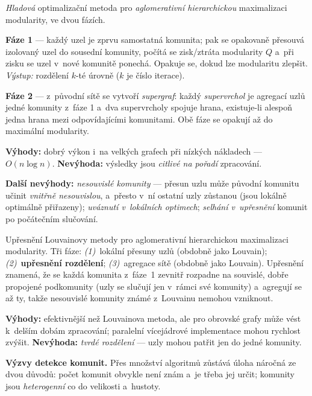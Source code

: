 \documentclass[11pt,a4paper]{article}
\theoremstyle{definition}
\begin{document}
\begin{defbox}
\emph{Hladová} optimalizační metoda pro \emph{aglomerativní hierarchickou} maximalizaci
modularity, ve dvou fázích.

\textbf{Fáze 1} --- každý uzel je zprvu samostatná komunita; pak se opakovaně přesouvá izolovaný
uzel do sousední komunity, počítá se zisk/ztráta modularity $Q$ a~při zisku se uzel v~nové
komunitě ponechá. Opakuje se, dokud lze modularitu zlepšit. \emph{Výstup:} rozdělení $k$-té
úrovně ($k$ je číslo iterace).

\textbf{Fáze 2} --- z~původní sítě se vytvoří \emph{supergraf}: každý \emph{supervrchol} je
agregací uzlů jedné komunity z~fáze 1 a~dva supervrcholy spojuje hrana, existuje-li alespoň jedna
hrana mezi odpovídajícími komunitami. Obě fáze se opakují až do maximální modularity.

\textbf{Výhody:} dobrý výkon i~na velkých grafech při nízkých nákladech --- $O(n\log n)$.
\textbf{Nevýhoda:} výsledky jsou \emph{citlivé na pořadí} zpracování.

\textbf{Další nevýhody:} \emph{nesouvislé komunity} --- přesun uzlu může původní komunitu učinit
\emph{vnitřně nesouvislou}, a~přesto v~ní ostatní uzly zůstanou (jsou lokálně optimálně
přiřazeny); \emph{uváznutí v~lokálních optimech}; \emph{selhání v~upřesnění} komunit po
počátečním slučování.
\end{defbox}

\begin{defbox}
Upřesnění Louvainovy metody pro aglomerativní hierarchickou maximalizaci modularity. Tři fáze:
\emph{(1)}~lokální přesuny uzlů (obdobně jako Louvain); \emph{(2)}~\textbf{upřesnění
rozdělení}; \emph{(3)}~agregace sítě (obdobně jako Louvain).
Upřesnění znamená, že se každá komunita z~fáze~1 zevnitř rozpadne na souvislé, dobře
propojené podkomunity (uzly se slučují jen v~rámci své komunity) a~agregují se až ty,
takže nesouvislé komunity známé z~Louvainu nemohou vzniknout.

\textbf{Výhody:} efektivnější než Louvainova metoda, ale pro obrovské grafy může vést
k~delším dobám zpracování; paralelní vícejádrové implementace mohou rychlost zvýšit.
\textbf{Nevýhoda:} \emph{tvrdé rozdělení} --- uzly mohou patřit jen do jedné komunity.
\end{defbox}

\textbf{Výzvy detekce komunit.} Přes množství algoritmů zůstává úloha náročná ze dvou důvodů:
počet komunit obvykle není znám a~je třeba jej určit; komunity jsou \emph{heterogenní} co do
velikosti a~hustoty.
\end{document}
